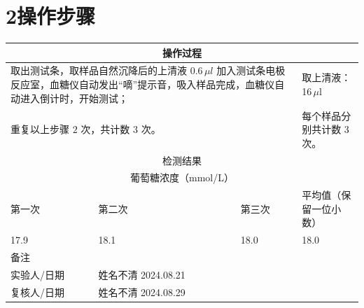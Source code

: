 \documentclass[UTF8,10pt,a4paper,fontset=fandol]{ctexart}
\newcommand{\fieldvalue}[1]{#1}
\newcommand{\handwritten}[1]{#1}
\begin{document}
\section*{2\quad 操作步骤}

\begin{tabularx}{\textwidth}{|X|X|X|X|}
\hline
\multicolumn{4}{|c|}{操作过程} \\
\hline
\multicolumn{3}{|l|}{取出测试条，取样品自然沉降后的上清液 $0.6\,\mu l$ 加入测试条电极反应室，血糖仪自动发出“嘀”提示音，吸入样品完成，血糖仪自动进入倒计时，开始测试；} &
取上清液：
\fieldvalue{\handwritten{16}}\,$\mu$l
\\
\hline
\multicolumn{3}{|l|}{重复以上步骤 $2$ 次，共计数 $3$ 次。} &
每个样品分别共计数
\fieldvalue{\handwritten{3}} 次。
\\
\hline
\multicolumn{4}{|c|}{检测结果} \\
\hline
\multicolumn{4}{|c|}{葡萄糖浓度（mmol/L）} \\
\hline
第一次 & 第二次 & 第三次 & 平均值（保留一位小数） \\
\hline
\fieldvalue{\handwritten{17.9}} &
\fieldvalue{\handwritten{18.1}} &
\fieldvalue{\handwritten{18.0}} &
\fieldvalue{\handwritten{18.0}}
\\
\hline
备注 &
\fieldvalue{\handwritten{\checkmark}}
\\
\hline
实验人/日期 &
\fieldvalue{\handwritten{姓名不清}} \qquad
\fieldvalue{\handwritten{2024.08.21}}
\\
\hline
复核人/日期 &
\fieldvalue{\handwritten{姓名不清}} \qquad
\fieldvalue{\handwritten{2024.08.29}}
\\
\hline
\end{tabularx}
\end{document}
